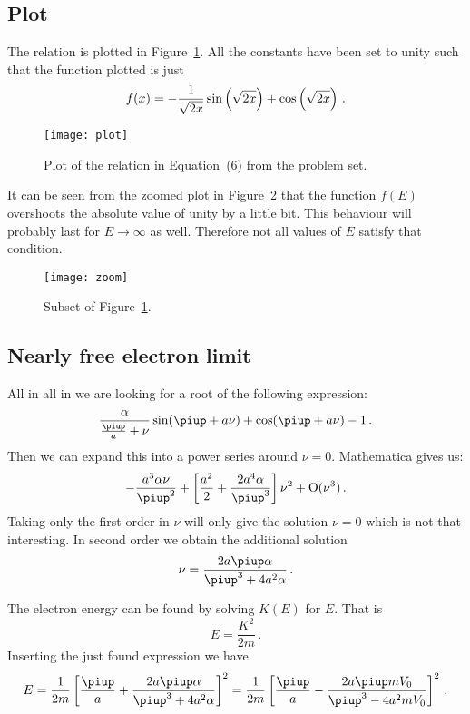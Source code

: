 \documentclass[11pt, english, fleqn, DIV=15, headinclude, BCOR=1cm]{scrartcl}
\begin{document}
\subsection{Plot}

The relation is plotted in Figure~\ref{fig:plot}. All the constants have been
set to unity such that the function plotted is just
\[
    f(x) = - \frac{1}{\sqrt{2x}} \sin\left( \sqrt{2x} \right) + \cos\left( \sqrt{2x} \right) \,.
\]

\begin{figure}[tb]
    \centering
    \texttt{[image: plot]}
    \caption{%
        Plot of the relation in Equation~(6) from the problem set.
    }
    \label{fig:plot}
\end{figure}

It can be seen from the zoomed plot in Figure~\ref{fig:zoom} that the function
$f(E)$ overshoots the absolute value of unity by a little bit. This behaviour
will probably last for $E \to \infty$ as well. Therefore not all values of $E$
satisfy that condition.

\begin{figure}[htbp]
    \centering
    \texttt{[image: zoom]}
    \caption{%
        Subset of Figure~\ref{fig:plot}.
    }
    \label{fig:zoom}
\end{figure}

\subsection{Nearly free electron limit}

All in all in we are looking for a root of the following expression:
\[
    \frac{\alpha}{\frac \piup a + \nu} \sin(\piup + a\nu) + \cos(\piup + a\nu)
    - 1 \,.
\]
Then we can expand this into a power series around $\nu = 0$. Mathematica gives
us:
\[
    - \frac{a^3 \alpha \nu}{\piup^2}
    + \sbr{\frac{a^2}{2} + \frac{2 a^4 \alpha}{\piup^3}} \nu^2
    + \mathrm O(\nu^3) \,.
\]
Taking only the first order in $\nu$ will only give the solution $\nu = 0$
which is not that interesting. In second order we obtain the additional
solution
\[
    \nu = \frac{2 a \piup \alpha}{\piup^3 + 4 a^2 \alpha} \,.
\]

The electron energy can be found by solving $K(E)$ for $E$. That is
\[
    E = \frac{K^2}{2m} \,.
\]
Inserting the just found expression we have
\[
    E
    = \frac 1{2m} \sbr{\frac{\piup}{a} + \frac{2 a \piup \alpha}{\piup^3 + 4 a^2 \alpha}}^2
    = \frac 1{2m} \sbr{\frac{\piup}{a} - \frac{2 a \piup m V_0}{\piup^3 - 4 a^2
    m V_0}}^2
    \,.
\]
\end{document}
